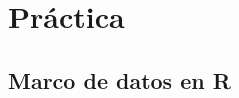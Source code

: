 \documentclass[a4paper]{scrreprt}
\begin{document}
\part{Práctica}
\chapter{Marco de datos en R}
\end{document}
